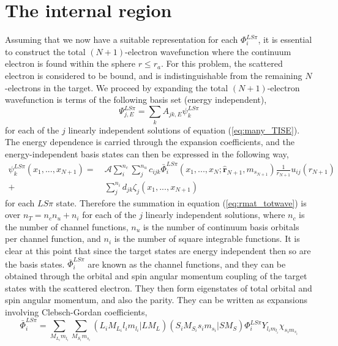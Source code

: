 \section{The internal region}\label{sec:internal}
Assuming that we now have a suitable representation for each $\Phi^{LS\pi}_i$, it is essential to construct the total $(N+1)$-electron wavefunction where the continuum electron is found within the sphere $r\leq r_a$. For this problem, the scattered electron is considered to be bound, and is indistinguishable from the remaining $N$-electrons in the target. We proceed by expanding the total $(N+1)$-electron wavefunction is terms of the following basis set (energy independent),
\begin{equation}\label{eq:rmat_totwave}
\Psi^{LS\pi}_{j,E}=\sum_kA_{jk,E}\psi^{LS\pi}_k
\end{equation}
for each of the $j$ linearly independent solutions of equation (\ref{eq:many_TISE}). The energy dependence is carried through the expansion coefficients, and the energy-independent basis states can then be expressed in the following way,
\begin{equation}\label{eq:rmat_basis}
\begin{split}
\psi^{LS\pi}_k(x_1, ..., x_{N+1})= &~ \mathcal{A}\sum^{n_c}_{i}\sum^{n_u}_{j}c_{ijk}\bar{\Phi}^{LS\pi}_i(x_1, ..., x_N; \hat{\boldsymbol{r}}_{N+1}, m_{s_{N+1}})\frac{1}{r_{N+1}}u_{ij}(r_{N+1})\\
+ &~ \sum_j^{n_i}d_{jk}\zeta_j(x_1, ..., x_{N+1})
\end{split}
\end{equation}
for each $LS\pi$ state. Therefore the summation in equation (\ref{eq:rmat_totwave}) is over $n_T = n_cn_u+n_i$ for each of the $j$ linearly independent solutions, where $n_c$ is the number of channel functions, $n_u$ is the number of continuum basis orbitals per channel function, and $n_i$ is the number of square integrable functions. It is clear at this point that since the target states are energy independent then so are the basis states. $\bar{\Phi}_i^{LS\pi}$ are known as the channel functions, and they can be obtained through the orbital and spin angular momentum coupling of the target states with the scattered electron. They then form eigenstates of total orbital and spin angular momentum, and also the parity. They can be written as expansions involving Clebsch-Gordan coefficients,
\begin{equation}\label{eq:rmat_chanfunctions}
\bar{\Phi}_i^{LS\pi} = \sum_{M_{L_i}m_{l_i}}\sum_{M_{S_i}m_{s_i}} (L_iM_{L_i}l_im_{l_i} | LM_L)(S_iM_{S_i}s_im_{s_i} | SM_S)\Phi_i^{LS\pi}Y_{l_im_{l_i}}\chi_{s_im_{s_i}}
\end{equation}
